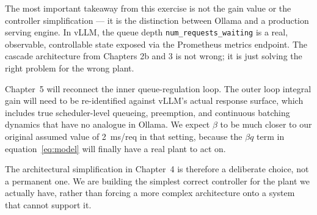 \documentclass[11pt]{article}
\begin{document}
The most important takeaway from this exercise is not the gain value or the
controller simplification --- it is the distinction between Ollama and a
production serving engine.  In vLLM, the queue depth \texttt{num\_requests\_waiting}
is a real, observable, controllable state exposed via the Prometheus metrics
endpoint.  The cascade architecture from Chapters 2b and 3 is not wrong; it
is just solving the right problem for the wrong plant.

Chapter~5 will reconnect the inner queue-regulation loop.  The outer loop
integral gain will need to be re-identified against vLLM's actual response
surface, which includes true scheduler-level queueing, preemption, and
continuous batching dynamics that have no analogue in Ollama.  We expect
$\beta$ to be much closer to our original assumed value of 2~ms/req in that
setting, because the $\beta q$ term in equation~\eqref{eq:model} will
finally have a real plant to act on.

The architectural simplification in Chapter~4 is therefore a deliberate
choice, not a permanent one.  We are building the simplest correct
controller for the plant we actually have, rather than forcing a more
complex architecture onto a system that cannot support it.
\end{document}
